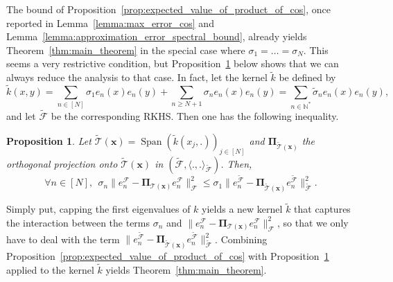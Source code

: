 \documentclass[twoside,11pt]{book}
\newtheorem{proposition}{Proposition}
\numberwithin{theorem}{chapter}
\numberwithin{definition}{chapter}
\numberwithin{proposition}{chapter}
\numberwithin{corollary}{chapter}
\numberwithin{example}{chapter}
\numberwithin{lemma}{chapter}
\DeclareMathOperator{\Span}{\mathrm{Span}}
\begin{document}
The bound of Proposition~\ref{prop:expected_value_of_product_of_cos}, once reported in  Lemma~\ref{lemma:max_error_cos} and Lemma~\ref{lemma:approximation_error_spectral_bound}, already yields Theorem~\ref{thm:main_theorem} in the special case where $\sigma_{1} = \dots = \sigma_{N}$. This seems a very restrictive condition, but Proposition~\ref{prop:kernel_perturbation_inequality} below shows that we can always reduce the analysis to that case.
In fact, let the kernel $\tilde{k}$ be defined by
\begin{equation}\label{eq:tilde_k_kernel_definition}
\tilde{k}(x,y) = \sum\limits_{n \in [N]} \sigma_{1}e_{n}(x)e_{n}(y) + \sum\limits_{n \geq N+1} \sigma_{n}e_{n}(x)e_{n}(y) = \sum\limits_{n \in \mathbb{N}^{*}} \tilde{\sigma}_{n}e_{n}(x)e_{n}(y),
\end{equation}
and let $\tilde{\mathcal{F}}$ be the corresponding RKHS. Then one has the following inequality.
\begin{proposition}\label{prop:kernel_perturbation_inequality}
Let $ \tilde{\mathcal{T}}(\bm{x}) = \Span \left( \tilde{k}(x_{j},.) \right)_{j \in [N]}$ and $\bm{\Pi}_{\tilde{\mathcal{T}}(\bm{x})}$ the orthogonal projection onto $\tilde{\mathcal{T}}(\bm{x})$ in $(\tilde{\mathcal{F}}, \langle .,.\rangle_{\tilde{\mathcal{F}}})$. Then,
\begin{equation}\label{eq:kernel_perturbation_inequality}
	\forall n \in [N], \:\: \sigma_{n} \|e_{n}^{\mathcal{F}} - \bm{\Pi}_{\mathcal{T}(\bm{x})} e_{n}^{\mathcal{F}}\|_{\mathcal{F}}^{2} \leq \sigma_{1}   \|e_{n}^{\tilde{\mathcal{F}}} - \bm{\Pi}_{\tilde{\mathcal{T}}(\bm{x})} e_{n}^{\tilde{\mathcal{F}}}\|_{\tilde{\mathcal{F}}}^{2}.
\end{equation}
\end{proposition}
Simply put, capping the first eigenvalues of $k$ yields a new kernel $\tilde{k}$ that captures the interaction between the terms $\sigma_{n}$ and $\|e_{n}^{\mathcal{F}} - \bm{\Pi}_{\mathcal{T}(\bm{x})} e_{n}^{\mathcal{F}}\|_{\mathcal{F}}^{2}$, so that we only have to deal with the term $\|e_{n}^{\tilde{\mathcal{F}}} - \bm{\Pi}_{\tilde{\mathcal{T}}(\bm{x})} e_{n}^{\tilde{\mathcal{F}}}\|_{\tilde{\mathcal{F}}}^{2}$.
Combining  Proposition~\ref{prop:expected_value_of_product_of_cos} with Proposition~\ref{prop:kernel_perturbation_inequality} applied to the kernel $\tilde{k}$ yields Theorem~\ref{thm:main_theorem}. 
\end{document}
